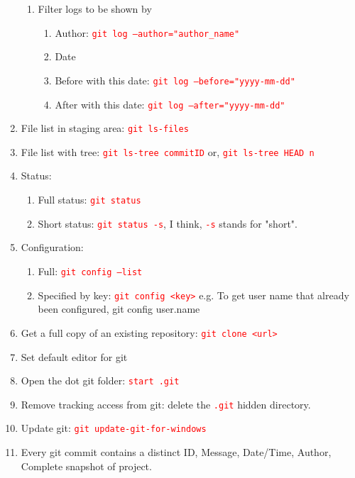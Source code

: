 \documentclass[10 pt]{article}
\newcommand{\R}{\textcolor{red}} %
\newcommand{\T}{\texttt}
\begin{document}
\begin{enumerate}
\begin{enumerate}
			\item Filter logs to be shown by
				\begin{enumerate}
					\item Author: \R{\T{git log --author="author\_name"}}
					\item Date
					\item Before with this date: \R{\T{git log --before="yyyy-mm-dd"}}
					\item After with this date: \R{\T{git log --after="yyyy-mm-dd"}}
				\end{enumerate}
		\end{enumerate}
	\item File list in staging area: \R{\T{git ls-files}}
	\item File list with tree: \R{\T{git ls-tree commitID}}	or, \R{\T{git ls-tree HEAD~n}}
	
	\item Status:
		\begin{enumerate}
			\item Full status: \R{\T{git status}}
			\item Short status: \R{\T{git status -s}}, I think, \R{\T{-s}} stands for "short".
		\end{enumerate}
	\item Configuration:
		\begin{enumerate}
			\item Full: \R{\T{git config --list}}
			\item Specified by key: \R{\T{git config <key>}} e.g. To get user name that already been configured, \textcolor{red!70}{{git config user.name}}
		\end{enumerate}
	\item Get a full copy of an existing repository: \R{\T{git clone <url>}}
	
	\item Set default editor for git
	\item Open the dot git folder: \R{\T{start .git}}
	\item Remove tracking access from git: delete the \R{\T{.git}} hidden directory.
	
	\item Update git: \R{\T{git update-git-for-windows}}
	\item Every git commit contains a distinct ID, Message, Date/Time, Author, Complete snapshot of project.
	

\end{enumerate}
\end{document}
